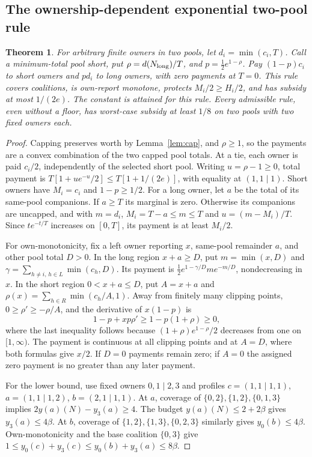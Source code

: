 \documentclass[11pt]{article}
\newtheorem{theorem}{Theorem}[section]
\theoremstyle{definition}\newtheorem{definition}[theorem]{Definition}
\theoremstyle{remark}\newtheorem{remark}[theorem]{Remark}
\begin{document}
\subsection{The ownership-dependent exponential two-pool rule}
\begin{theorem}\label{hist:exponential}
For arbitrary finite owners in two pools, let $d_i=\min(c_i,T)$.
Call a minimum-total pool short, put
$\rho=d(N_{\rm long})/T$, and $p=\tfrac12e^{1-\rho}$.
Pay $(1-p)c_i$ to short owners and $pd_i$ to long owners, with zero
payments at $T=0$. This rule covers coalitions, is own-report monotone,
protects $M_i/2\ge H_i/2$, and has subsidy at most $1/(2e)$.
The constant is attained for this rule. Every admissible rule, even
without a floor, has worst-case subsidy at least $1/8$ on two pools
with two fixed owners each.
\end{theorem}
\begin{proof}
Capping preserves worth by Lemma~\ref{lem:cap}, and $\rho\ge1$, so the
payments are a convex combination of the two capped pool totals. At a
tie, each owner is paid $c_i/2$, independently of the selected short pool.
Writing $u=\rho-1\ge0$, total payment is
$T[1+ue^{-u}/2]\le T[1+1/(2e)]$, with equality at $(1,1\mid1)$.
Short owners have $M_i=c_i$ and $1-p\ge1/2$. For a long owner, let $a$
be the total of its same-pool companions. If $a\ge T$ its marginal is
zero. Otherwise its companions are uncapped, and with $m=d_i$,
$M_i=T-a\le m\le T$ and $u=(m-M_i)/T$. Since $t e^{-t/T}$ increases
on $[0,T]$, its payment is at least $M_i/2$.

For own-monotonicity, fix a left owner reporting $x$, same-pool remainder
$a$, and other pool total $D>0$. In the long region $x+a\ge D$, put
$m=\min(x,D)$ and $\gamma=\sum_{h\ne i,\,h\in L}\min(c_h,D)$.
Its payment is $\tfrac12e^{1-\gamma/D}m e^{-m/D}$, nondecreasing in $x$.
In the short region $0<x+a\le D$, put $A=x+a$ and
$\rho(x)=\sum_{h\in R}\min(c_h/A,1)$.
Away from finitely many clipping points,
$0\ge\rho'\ge-\rho/A$, and the derivative of $x(1-p)$ is
\[
 1-p+xp\rho'\ge1-p(1+\rho)\ge0,
\]
where the last inequality follows because
$(1+\rho)e^{1-\rho}/2$ decreases from one on $[1,\infty)$.
The payment is continuous at all clipping points and at $A=D$, where
both formulas give $x/2$. If $D=0$ payments remain zero; if $A=0$ the
assigned zero payment is no greater than any later payment.

For the lower bound, use fixed owners $0,1\mid2,3$ and profiles
$c=(1,1\mid1,1)$, $a=(1,1\mid1,2)$, $b=(2,1\mid1,1)$.
At $a$, coverage of $\{0,2\},\{1,2\},\{0,1,3\}$ implies
$2y(a)(N)-y_3(a)\ge4$. The budget $y(a)(N)\le2+2\beta$ gives
$y_3(a)\le4\beta$. At $b$, coverage of
$\{1,2\},\{1,3\},\{0,2,3\}$ similarly gives $y_0(b)\le4\beta$.
Own-monotonicity and the base coalition $\{0,3\}$ give
$1\le y_0(c)+y_3(c)\le y_0(b)+y_3(a)\le8\beta$.
\end{proof}
\end{document}
